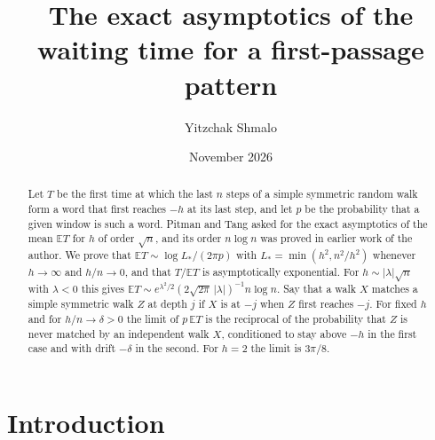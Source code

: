 \documentclass[11pt]{amsart}
\title[The constant for a first-passage pattern]{The exact asymptotics of the waiting time for a first-passage pattern}
\author{Yitzchak Shmalo}
\date{November 2026}
\theoremstyle{remark}
\numberwithin{equation}{section}
\newcommand{\EE}{\mathbb{E}}
\begin{document}
\begin{abstract}
Let $T$ be the first time at which the last $n$ steps of a simple symmetric random walk form a word that first reaches $-h$ at its last step, and let $p$ be the probability that a given window is such a word. Pitman and Tang asked for the exact asymptotics of the mean $\EE T$ for $h$ of order $\sqrt n$, and its order $n\log n$ was proved in earlier work of the author. We prove that $\EE T\sim\log L_*/(2\pi p)$ with $L_*=\min(h^2,n^2/h^2)$ whenever $h\to\infty$ and $h/n\to0$, and that $T/\EE T$ is asymptotically exponential. For $h\sim|\lambda|\sqrt n$ with $\lambda<0$ this gives $\EE T\sim e^{\lambda^2/2}(2\sqrt{2\pi}\,|\lambda|)^{-1}n\log n$. Say that a walk $X$ matches a simple symmetric walk $Z$ at depth $j$ if $X$ is at $-j$ when $Z$ first reaches $-j$. For fixed $h$ and for $h/n\to\delta>0$ the limit of $p\,\EE T$ is the reciprocal of the probability that $Z$ is never matched by an independent walk $X$, conditioned to stay above $-h$ in the first case and with drift $-\delta$ in the second. For $h=2$ the limit is $3\pi/8$.
\end{abstract}
\maketitle

\section{Introduction}
\end{document}
